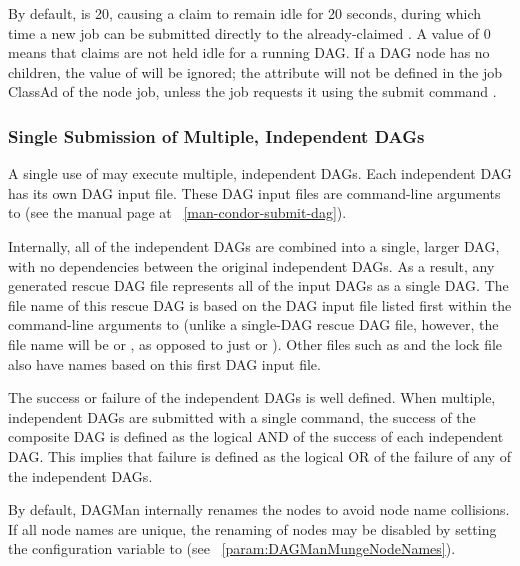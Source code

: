 By default,  is 20, 
causing a claim to remain idle for 20 seconds, 
during which time a new job can be submitted
directly to the already-claimed . 
A value of 0 means that claims are not held idle for a running DAG.
If a DAG node has no children,
the value of  will be ignored;
the  attribute will not be defined in the job ClassAd 
of the node job, unless the job requests it using the submit command
. 

\subsubsection{\label{sec:MultipleDAGs}Single Submission of Multiple, Independent DAGs}

A single use of  may execute multiple, independent DAGs.
Each independent DAG has its own DAG input file.
These DAG input files are command-line arguments to
(see the  manual page at ~\ref{man-condor-submit-dag}).

Internally, all of the independent DAGs are combined
into a single, larger DAG, with no dependencies between
the original independent DAGs.
As a result,
any generated rescue DAG file represents all of the input DAGs
as a single DAG.
The file name of this rescue DAG is based on the DAG input file
listed first within the command-line arguments to
 (unlike a single-DAG rescue DAG file, however,
the file name will be
 or
,
as opposed to
just 
or ).
Other files such
as  and the lock file also have names based on this
first DAG input file.

The success or failure of the independent DAGs is well defined.
When multiple, independent DAGs are submitted with a single
command, the
success of the composite DAG is defined as the logical AND
of the success of each independent DAG.
This implies that failure is defined as the logical OR
of the failure of any of the independent DAGs.

By default, DAGMan internally renames the nodes to avoid node name collisions.  
If all node names are unique, 
the renaming of nodes may be disabled by
setting the configuration variable 
to  (see ~\ref{param:DAGManMungeNodeNames}).


